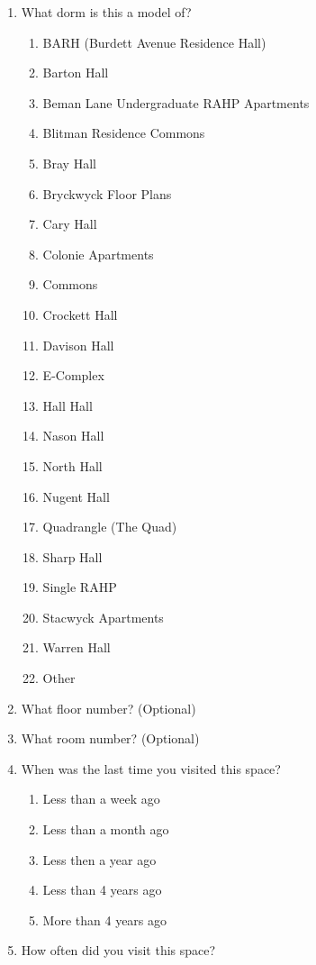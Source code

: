 \documentclass[12pt]{article}
\begin{document}
\begin{enumerate}
\begin{enumerate}
        \end{enumerate}
      \item What dorm is this a model of?
      \begin{enumerate}
        \item BARH (Burdett Avenue Residence Hall)
        \item Barton Hall
        \item Beman Lane Undergraduate RAHP Apartments
        \item Blitman Residence Commons
        \item Bray Hall
        \item Bryckwyck Floor Plans
        \item Cary Hall
        \item Colonie Apartments
        \item Commons
        \item Crockett Hall
        \item Davison Hall
        \item E-Complex
        \item Hall Hall
        \item Nason Hall
        \item North Hall
        \item Nugent Hall
        \item Quadrangle (The Quad)
        \item Sharp Hall
        \item Single RAHP
        \item Stacwyck Apartments
        \item Warren Hall
        \item Other
      \end{enumerate}
    \item What floor number? (Optional)
    \item What room number? (Optional)
    \item When was the last time you visited this space?
      \begin{enumerate}
        \item Less than a week ago
        \item Less than a month ago
        \item Less then a year ago
        \item Less than 4 years ago
        \item More than 4 years ago
      \end{enumerate}
    \item How often did you visit this space?

\end{enumerate}
\end{document}
